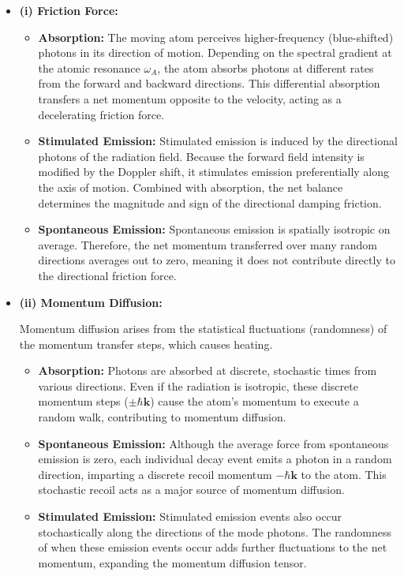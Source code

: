 \documentclass[11pt,a4paper]{article}
\begin{document}
\begin{itemize}
    \item \textbf{(i) Friction Force:}
    \begin{itemize}
        \item \textbf{Absorption:} The moving atom perceives higher-frequency (blue-shifted) photons in its direction of motion. Depending on the spectral gradient at the atomic resonance $\omega_A$, the atom absorbs photons at different rates from the forward and backward directions. This differential absorption transfers a net momentum opposite to the velocity, acting as a decelerating friction force.
        \item \textbf{Stimulated Emission:} Stimulated emission is induced by the directional photons of the radiation field. Because the forward field intensity is modified by the Doppler shift, it stimulates emission preferentially along the axis of motion. Combined with absorption, the net balance determines the magnitude and sign of the directional damping friction.
        \item \textbf{Spontaneous Emission:} Spontaneous emission is spatially isotropic on average. Therefore, the net momentum transferred over many random directions averages out to zero, meaning it does not contribute directly to the directional friction force.
    \end{itemize}
    \item \textbf{(ii) Momentum Diffusion:}

    Momentum diffusion arises from the statistical fluctuations (randomness) of the momentum transfer steps, which causes heating.
    \begin{itemize}
        \item \textbf{Absorption:} Photons are absorbed at discrete, stochastic times from various directions. Even if the radiation is isotropic, these discrete momentum steps ($\pm \hbar\mathbf{k}$) cause the atom's momentum to execute a random walk, contributing to momentum diffusion.
        \item \textbf{Spontaneous Emission:} Although the average force from spontaneous emission is zero, each individual decay event emits a photon in a random direction, imparting a discrete recoil momentum $-\hbar\mathbf{k}$ to the atom. This stochastic recoil acts as a major source of momentum diffusion.
        \item \textbf{Stimulated Emission:} Stimulated emission events also occur stochastically along the directions of the mode photons. The randomness of when these emission events occur adds further fluctuations to the net momentum, expanding the momentum diffusion tensor.
    \end{itemize}
\end{itemize}
\end{document}
